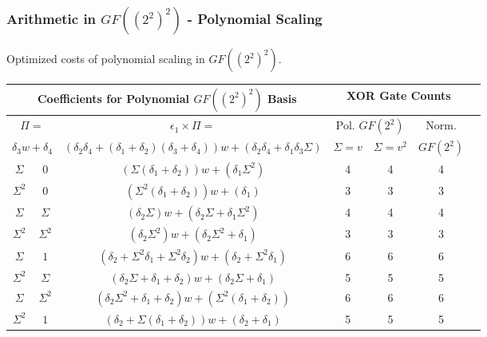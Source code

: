 \documentclass[10pt]{beamer}
\begin{document}
\begin{frame}
	\frametitle{Arithmetic in $GF((2^2)^2)$ - Polynomial Scaling}
Optimized costs of polynomial scaling in $GF((2^2)^2)$.
\begin{table}[ht!]
\centering
\scriptsize
	\begin{tabular}{|c|c|c|c|c|c|c|} \hline
		\multicolumn{3}{|c|}{Coefficients for Polynomial $GF((2^2)^2)$ Basis} & \multicolumn{3}{c|}{XOR Gate Counts} \\ \hline
		\multicolumn{2}{|c}{$\Pi = $} & \multicolumn{1}{|c|}{$\epsilon_1 \times \Pi = $} & \multicolumn{2}{|c|}{Pol. $GF(2^2)$} & \multicolumn{1}{c|}{Norm.} \\
		\multicolumn{2}{|c|}{$\delta_3 w + \delta_4$} & \multicolumn{1}{c}{$(\delta_2\delta_4 + (\delta_1 + \delta_2)(\delta_3 + \delta_4))w + (\delta_2\delta_4 + \delta_1\delta_3\Sigma)$} & \multicolumn{1}{|c|}{$\Sigma = v$} & \multicolumn{1}{|c|}{$\Sigma = v^2$} & \multicolumn{1}{|c|}{$GF(2^2)$} \\ \hline

		$\Sigma$ & $0$          & $(\Sigma(\delta_1 + \delta_2))w + (\delta_1\Sigma^2)$                         & 4 & 4 & 4  \\
		$\Sigma^2$ & $0$        & $(\Sigma^2(\delta_1 + \delta_2))w + (\delta_1)$                               & 3 & 3 & 3  \\
		$\Sigma$ & $\Sigma$     & $(\delta_2\Sigma)w + (\delta_2\Sigma + \delta_1\Sigma^2)$                     & 4 & 4 & 4  \\
		$\Sigma^2$ & $\Sigma^2$ & $(\delta_2\Sigma^2)w + (\delta_2\Sigma^2 + \delta_1)$                         & 3 & 3 & 3  \\
		$\Sigma$ & $1$          & $(\delta_2 + \Sigma^2\delta_1 + \Sigma^2\delta_2)w + (\delta_2 + \Sigma^2\delta_1)$ & 6 & 6 & 6  \\
		$\Sigma^2$ & $\Sigma$   & $(\delta_2\Sigma + \delta_1 + \delta_2)w + (\delta_2\Sigma + \delta_1)$       & 5 & 5 & 5 \\
		$\Sigma$ & $\Sigma^2$   & $(\delta_2\Sigma^2 + \delta_1 + \delta_2)w + (\Sigma^2(\delta_1 + \delta_2))$ & 6 & 6 & 6  \\
		$\Sigma^2$ & $1$        & $(\delta_2 + \Sigma(\delta_1 + \delta_2))w + (\delta_2 + \delta_1)$     & 5 & 5 & 5 \\ \hline
    \end{tabular}
\end{table}
\end{frame}
\end{document}
